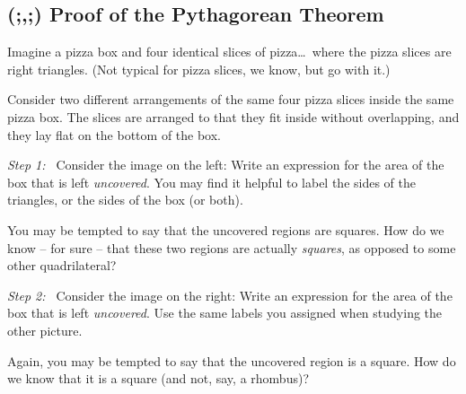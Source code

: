 \subsection{(;,;) Proof of the Pythagorean Theorem}
\label{sec:pythagproof}

Imagine a pizza box and four identical slices of pizza\ldots\ where the pizza slices are right triangles. (Not typical for pizza slices, we know, but go with it.)

\begin{center}
\end{center}

Consider two different arrangements of the same four pizza slices inside the same pizza box. The slices are arranged to that they fit inside without overlapping, and they lay flat on the bottom of the box.

\begin{center}
\end{center}

\textit{Step 1:~} Consider the image on the left: Write an expression for the area of the box that is left \textit{uncovered}. You may find it helpful to label the sides of the triangles, or the sides of the box (or both).

You may be tempted to say that the uncovered regions are squares. How do we know -- for sure -- that these two regions are actually \textit{squares}, as opposed to some other quadrilateral?

\textit{Step 2:~} Consider the image on the right: Write an expression for the area of the box that is left \textit{uncovered}. Use the same labels you assigned when studying the other picture.

Again, you may be tempted to say that the uncovered region is a square. How do we know that it is a square (and not, say, a rhombus)?

